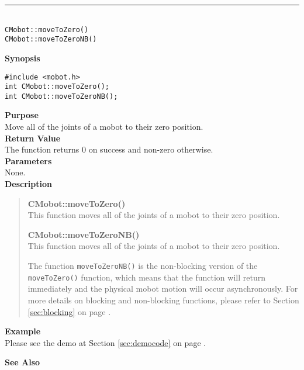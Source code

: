 \noindent
\vspace{5pt}
\rule{4.5in}{0.015in}\\
\noindent
{\LARGE \texttt{CMobot::moveToZero()}}\\
{\LARGE \texttt{CMobot::moveToZeroNB()}}\\
{}

\noindent
{\bf Synopsis}
\vspace{-8pt}
\begin{verbatim}
#include <mobot.h>
int CMobot::moveToZero();
int CMobot::moveToZeroNB();
\end{verbatim}

\noindent
{\bf Purpose}\\
Move all of the joints of a mobot to their zero position.\\

\noindent
{\bf Return Value}\\
The function returns 0 on success and non-zero otherwise.\\

\noindent
{\bf Parameters}\\
None.\\

\noindent
{\bf Description}\\
\vspace{-12pt}
\begin{quote}
{\bf CMobot::moveToZero()}\\
This function moves all of the joints of a mobot to their zero position.

{\bf CMobot::moveToZeroNB()}\\
This function moves all of the joints of a mobot to their zero position.

The function \texttt{moveToZeroNB()} is the non-blocking version of
the \texttt{moveToZero()} function, which means that the function will return
immediately and the physical mobot motion will occur asynchronously. For
more details on blocking and non-blocking functions, please refer to 
Section \ref{sec:blocking} on page \pageref{sec:blocking}.\\
\end{quote}

\noindent
{\bf Example}\\
Please see the demo at Section \ref{sec:democode} on page \pageref{sec:democode}.\\
\noindent

\noindent
{\bf See Also}\\

